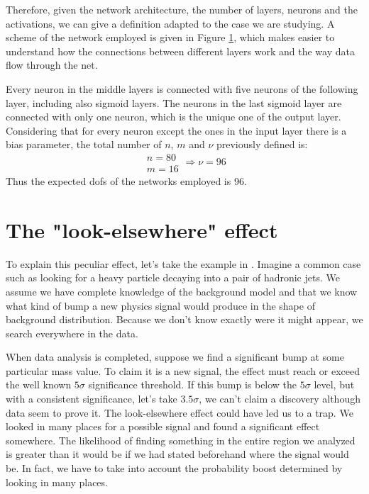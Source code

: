 Therefore, given the network architecture, the number of layers, neurons and the activations, we can give a definition adapted to the case we are studying. A scheme of the network employed is given in Figure \ref{fig:DOF}, which makes easier to understand how the connections between different layers work and the way data flow through the net.

\begin{figure}[H]
    \centering
    
    \label{fig:DOF}
\end{figure}

Every neuron in the middle layers is connected with five neurons of the following layer, including also sigmoid layers. The neurons in the last sigmoid layer are connected with only one neuron, which is the unique one of the output layer. Considering that for every neuron except the ones in the input layer there is a bias parameter, the total number of $n$, $m$ and $\nu$ previously defined is:
\begin{equation}
	\begin{array}{l}
	n = 80\\
	m = 16
	\end{array}
	\Longrightarrow
	\nu = 96
\end{equation}
Thus the expected dofs of the networks employed is 96.



\section{The "look-elsewhere" effect}
To explain this peculiar effect, let's take the example in \cite{look-elsewhere}. Imagine a common case such as looking for a heavy particle decaying into a pair of hadronic jets. We assume we have complete knowledge of the background model and that we know what kind of bump a new physics signal would produce in the shape of background distribution. Because we don't know exactly were it might appear, we search everywhere in the data.

When data analysis is completed, suppose we find a significant bump at some particular mass value. To claim it is a new signal, the effect must reach or exceed the well known $5\sigma$ significance threshold. If this bump is below the $5\sigma$ level, but with a consistent significance, let's take $3.5\sigma$, we can't claim a discovery although data seem to prove it. The look-elsewhere effect could have led us to a trap. We looked in many places for a possible signal and found a significant effect somewhere. The likelihood of finding something in the entire region we analyzed is greater than it would be if we had stated beforehand where the signal would be. In fact, we have to take into account the probability boost determined by looking in many places.

